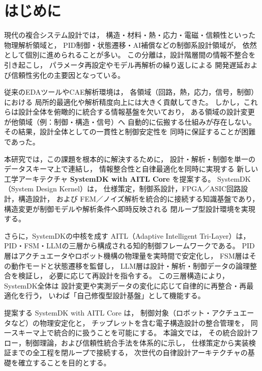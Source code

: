 \section{はじめに}

現代の複合システム設計では，
構造・材料・熱・応力・電磁・信頼性といった物理解析領域と，
PID制御・状態遷移・AI補償などの制御系設計領域が，
依然として個別に進められることが多い。
この分離は，設計階層間の情報不整合を引き起こし，
パラメータ再設定やモデル再解析の繰り返しによる
開発遅延および信頼性劣化の主要因となっている。

従来のEDAツールやCAE解析環境は，
各領域（回路，熱，応力，信号，制御）における
局所的最適化や解析精度向上には大きく貢献してきた。
しかし，これらは設計全体を俯瞰的に統合する情報基盤を欠いており，
ある領域の設計変更が他領域（例：制御・構造・信号）へ
自動的に伝搬する仕組みが存在しない。
その結果，設計全体としての一貫性と制御安定性を
同時に保証することが困難であった。

本研究では，この課題を根本的に解決するために，
設計・解析・制御を単一のデータスキーマ上で連結し，
情報整合性と自律最適化を同時に実現する
新しい工学アーキテクチャ
\textbf{SystemDK with AITL Core} を提案する。
SystemDK（System Design Kernel）は，
仕様策定，制御系設計，FPGA／ASIC回路設計，構造設計，
および FEM／ノイズ解析を統合的に接続する知識基盤であり，
構造変更が制御モデルや解析条件へ即時反映される
閉ループ型設計環境を実現する。

さらに，SystemDKの中核を成す
AITL（Adaptive Intelligent Tri-Layer）は，
PID・FSM・LLMの三層から構成される知的制御フレームワークである。
PID層はアクチュエータやロボット機構の物理量を実時間で安定化し，
FSM層はその動作モードと状態遷移を監督し，
LLM層は設計・解析・制御データの論理整合を検証し，
必要に応じて再設計を指令する。
この三層構造により，SystemDK全体は
設計変更や実測データの変化に応じて自律的に再整合・再最適化を行う，
いわば「自己修復型設計基盤」として機能する。

提案する SystemDK with AITL Core は，
制御対象（ロボット・アクチュエータなど）の物理安定化と，
チップレットを含む電子構造設計の整合管理を，
同一スキーマ上で統合的に扱うことを可能にする。
本論文では，
その統合設計フロー，制御理論，および信頼性統合手法を体系的に示し，
仕様策定から実装検証までの全工程を閉ループで接続する，
次世代の自律設計アーキテクチャの基礎を確立することを目的とする。
